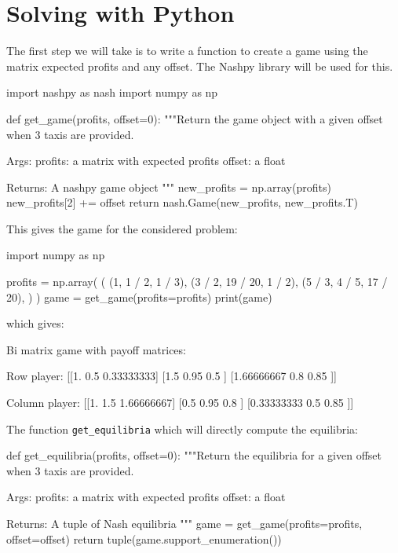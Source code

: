 \section{Solving with Python}\label{sec:game_theory_solving-with-python}

The first step we will take is to write a function to create a game using the
matrix expected profits and any offset. The Nashpy library will be used for this.

\begin{pyin}
import nashpy as nash
import numpy as np


def get_game(profits, offset=0):
    """Return the game object with a given offset when 3 taxis are
    provided.

    Args:
        profits: a matrix with expected profits
        offset: a float

    Returns:
        A nashpy game object
    """
    new_profits = np.array(profits)
    new_profits[2] += offset
    return nash.Game(new_profits, new_profits.T)
\end{pyin}


This gives the game for the considered problem:

\begin{pyin}
import numpy as np

profits = np.array(
    (
        (1, 1 / 2, 1 / 3),
        (3 / 2, 19 / 20, 1 / 2),
        (5 / 3, 4 / 5, 17 / 20),
    )
)
game = get_game(profits=profits)
print(game)
\end{pyin}

which gives:

\begin{pyout}
Bi matrix game with payoff matrices:

Row player:
[[1.         0.5        0.33333333]
 [1.5        0.95       0.5       ]
 [1.66666667 0.8        0.85      ]]

Column player:
[[1.         1.5        1.66666667]
 [0.5        0.95       0.8       ]
 [0.33333333 0.5        0.85      ]]
\end{pyout}

The function \texttt{get_equilibria} which will directly compute the
equilibria:

\begin{pyin}
def get_equilibria(profits, offset=0):
    """Return the equilibria for a given offset when 3 taxis are
    provided.

    Args:
        profits: a matrix with expected profits
        offset: a float

    Returns:
        A tuple of Nash equilibria
    """
    game = get_game(profits=profits, offset=offset)
    return tuple(game.support_enumeration())
\end{pyin}


